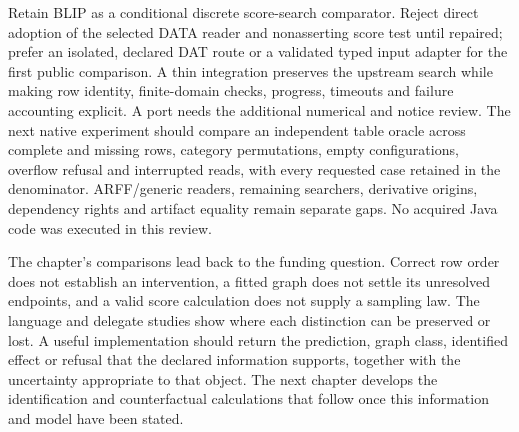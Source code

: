 Retain BLIP as a conditional discrete score-search comparator. Reject direct
adoption of the selected DATA reader and nonasserting score test until repaired;
prefer an isolated, declared DAT route or a validated typed input adapter for the
first public comparison. A thin integration preserves the upstream search while
making row identity, finite-domain checks, progress, timeouts and failure accounting
explicit. A port needs the additional numerical and notice review. The next native
experiment should compare an independent table oracle across complete and missing
rows, category permutations, empty configurations, overflow refusal and interrupted
reads, with every requested case retained in the denominator. ARFF/generic readers,
remaining searchers, derivative origins, dependency rights and artifact equality
remain separate gaps. No acquired Java code was executed in this review.
\citep{exec28_blip_helpers,exec28_blip_helper_reference}

The chapter's comparisons lead back to the funding question. Correct row
order does not establish an intervention, a fitted graph does not settle
its unresolved endpoints, and a valid score calculation does not supply a
sampling law. The language and delegate studies show where each distinction
can be preserved or lost. A useful implementation should return the
prediction, graph class, identified effect or refusal that the declared
information supports, together with the uncertainty appropriate to that
object. The next chapter develops the identification and counterfactual
calculations that follow once this information and model have been stated.

